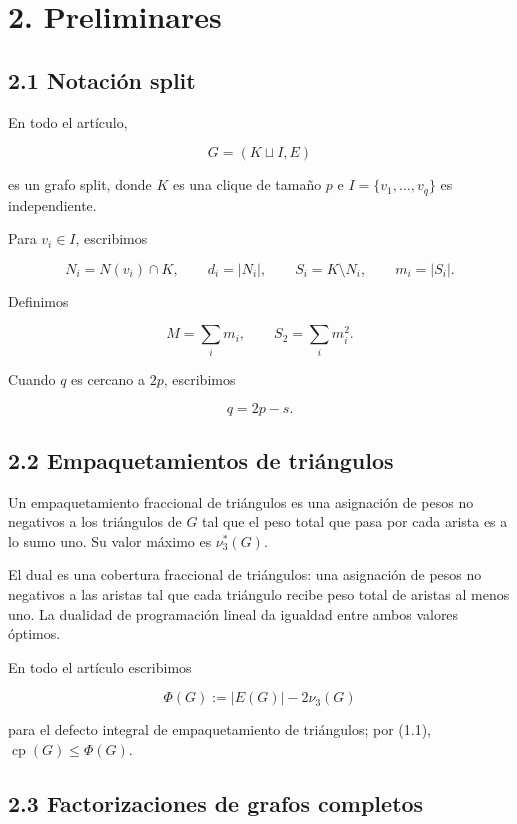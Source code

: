 \documentclass[
  11pt,
]{article}
\begin{document}
\section{2. Preliminares}\label{preliminares}

\subsection{2.1 Notación split}\label{notaciuxf3n-split}

En todo el artículo,

\[
G=(K\sqcup I,E)
\]

es un grafo split, donde \(K\) es una clique de tamaño \(p\) e
\(I=\{v_1,\ldots,v_q\}\) es independiente.

Para \(v_i\in I\), escribimos

\[
N_i=N(v_i)\cap K,
\qquad
d_i=|N_i|,
\qquad
S_i=K\setminus N_i,
\qquad
m_i=|S_i|.
\]

Definimos

\[
M=\sum_i m_i,
\qquad
S_2=\sum_i m_i^2.
\]

Cuando \(q\) es cercano a \(2p\), escribimos

\[
q=2p-s.
\tag{2.1}
\]

\subsection{2.2 Empaquetamientos de
triángulos}\label{empaquetamientos-de-triuxe1ngulos}

Un empaquetamiento fraccional de triángulos es una asignación de pesos
no negativos a los triángulos de \(G\) tal que el peso total que pasa
por cada arista es a lo sumo uno. Su valor máximo es \(\nu_3^*(G)\).

El dual es una cobertura fraccional de triángulos: una asignación de
pesos no negativos a las aristas tal que cada triángulo recibe peso
total de aristas al menos uno. La dualidad de programación lineal da
igualdad entre ambos valores óptimos.

En todo el artículo escribimos

\[
\Phi(G):=|E(G)|-2\nu_3(G)
\]

para el defecto integral de empaquetamiento de triángulos; por (1.1),
\(\operatorname{cp}(G)\le\Phi(G)\).

\subsection{2.3 Factorizaciones de grafos
completos}\label{factorizaciones-de-grafos-completos}
\end{document}
